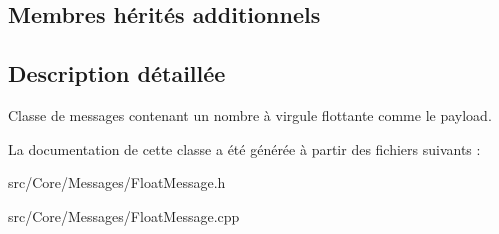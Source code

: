 \subsection*{Membres hérités additionnels}


\subsection{Description détaillée}
Classe de messages contenant un nombre à virgule flottante comme le payload. 

La documentation de cette classe a été générée à partir des fichiers suivants \-:\begin{DoxyCompactItemize}
\item 
src/\-Core/\-Messages/Float\-Message.\-h\item 
src/\-Core/\-Messages/Float\-Message.\-cpp\end{DoxyCompactItemize}
